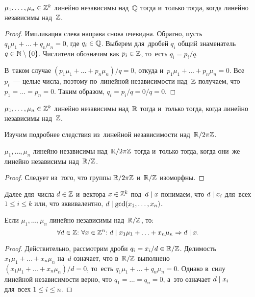 \documentclass{article}
\begin{document}
\begin{lemma*}
    $\mu_1, \ldots, \mu_n \in \mathbb{Z}^k$ линейно независимы над~$\mathbb{Q}$ тогда и~только тогда, когда линейно независимы над~$\mathbb{Z}$.
\end{lemma*}

\begin{proof}
    Импликация слева направа снова очевидна. Обратно, пусть $q_1 \mu_1 + \ldots + q_n \mu_n = 0$, где $q_i \in \mathbb{Q}$.
    Выберем для~дробей $q_i$ общий знаменатель $q \in \mathbb{N} \setminus \{ 0 \}$. Числители обозначим как $p_i \in \mathbb{Z}$, то~есть $q_i = p_i / q$.

    В~таком случае $(p_1 \mu_1 + \ldots + p_n \mu_n) / q = 0$, откуда и~$p_1 \mu_1 + \ldots + p_n \mu_n = 0$.
    Все $p_i$~— целые числа, поэтому по~линейной независимости над~$\mathbb{Z}$ получаем, что $p_1 = \ldots = p_n = 0$.
    Таким образом, $q_i = p_i / q = 0 / q = 0$.
\end{proof}

\begin{consequence*}
    $\mu_1, \ldots, \mu_n \in \mathbb{Z}^k$ линейно независимы над~$\mathbb{R}$ тогда и~только тогда, когда линейно независимы над~$\mathbb{Z}$.
\end{consequence*}

Изучим подробнее следствия из~линейной независимости над~$\mathbb{R} / 2 \pi \mathbb{Z}$.

\begin{statement*}
    $\mu_1, \ldots, \mu_n$ линейно независимы над~$\mathbb{R} / 2 \pi \mathbb{Z}$
    тогда и~только тогда, когда они~же линейно независимы над~$\mathbb{R} / \mathbb{Z}$.
\end{statement*}

\begin{proof}
    Следует из~того, что группы $\mathbb{R} / 2 \pi \mathbb{Z}$ и~$\mathbb{R} / \mathbb{Z}$ изоморфны.
\end{proof}

Далее для~числа $d \in \mathbb{Z}$ и~вектора $x \in \mathbb{Z}^k$ под~$d \mid x$ понимаем, что $d \mid x_i$ для~всех $1 \leq i \leq k$
или, что эквивалентно, $d \mid \gcd(x_1, \ldots, x_n)$.

\begin{lemma*}
    Если $\mu_1, \ldots, \mu_n$ линейно независимы над~$\mathbb{R} / \mathbb{Z}$, то:
    $$
        \forall d \in \Z{:}\ \forall x \in \Z^n{:}\ d \divides x_1 \mu_1 + \ldots + x_n \mu_n \Rightarrow d \divides x.
    $$
\end{lemma*}

\begin{proof}
    Действительно, рассмотрим дроби $q_i = x_i / d \in \mathbb{R} / \mathbb{Z}$. Делимость $x_1 \mu_1 + \ldots + x_n \mu_n$ на~$d$ означает,
    что в~$\mathbb{R} / \mathbb{Z}$ выполнено $(x_1 \mu_1 + \ldots + x_n \mu_n) / d = 0$, то~есть $q_1 \mu_1 + \ldots + q_n \mu_n = 0$.
    Однако в~силу линейной независимости верно, что $q_1 = \ldots = q_n = 0$, а~это означает $d \mid x_i$ для~всех $1 \leq i \leq n$.
\end{proof}
\end{document}
